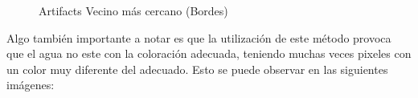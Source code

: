 \documentclass[10pt, a4paper]{article}
\begin{document}
\begin{figure}[H]
	\caption{Artifacts Vecino m\'as cercano (Bordes)} 
\end{figure}

Algo tambi\'en importante a notar es que la utilizaci\'on de este m\'etodo provoca que el agua no este con la coloraci\'on adecuada, teniendo muchas veces pixeles con un color muy diferente del adecuado. Esto se puede observar en las siguientes im\'agenes:
\end{document}

